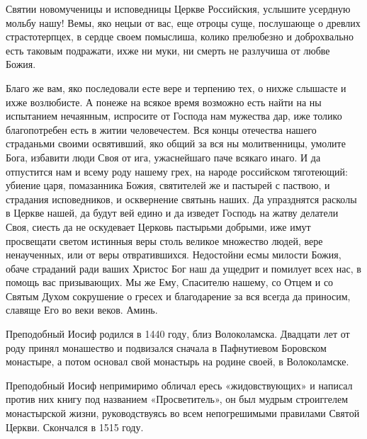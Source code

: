 \bigskip\bigskip\mychapterending

 



Святии новомученицы и исповедницы Церкве Российския, услышите усердную мольбу нашу! Вемы, яко нецыи от вас, еще отроцы суще, послушающе о древлих страстотерпцех, в сердце своем помыслиша, колико прелюбезно и доброхвально есть таковым подражати, ихже ни муки, ни смерть не разлучиша от любве Божия. 


Благо же вам, яко последовали есте вере и терпению тех, о нихже слышасте и ихже возлюбисте. А понеже на всякое время возможно есть найти на ны испытанием нечаянным, испросите от Господа нам мужества дар, иже толико благопотребен есть в житии человечестем. Вся концы отечества нашего страданьми своими освятивший, яко общий за вся ны молитвенницы, умолите Бога, избавити люди Своя от ига, ужаснейшаго паче всякаго инаго. И да отпустится нам и всему роду нашему грех, на народе российском тяготеющий: убиение царя, помазанника Божия, святителей же и пастырей с паствою, и страдания исповедников, и осквернение святынь наших. Да упразднятся расколы в Церкве нашей, да будут вей едино и да изведет Господь на жатву делатели Своя, сиесть да не оскудевает Церковь пастырьми добрыми, иже имут просвещати светом истинныя веры столь великое множество людей, вере ненаученных, или от веры отвратившихся. Недостойни есмы милости Божия, обаче страданий ради ваших Христос Бог наш да ущедрит и помилует всех нас, в помощь вас призывающих. Мы же Ему, Спасителю нашему, со Отцем и со Святым Духом сокрушение о гресех и благодарение за вся всегда да приносим, славяще Его во веки веков. Аминь.


\bigskip\bigskip\mychapterending

 

Преподобный Иосиф родился в 1440 году, близ Волоколамска. Двадцати лет от роду принял монашество и подвизался сначала в Пафнутиевом Боровском монастыре, а потом основал свой монастырь на родине своей, в Волоколамске. 

Преподобный Иосиф непримиримо обличал ересь «жидовствующих» и написал против них книгу под названием «Просветитель», он был мудрым строиггелем монастырской жизни, руководствуясь во всем непогрешимыми правилами Святой Церкви. Скончался в 1515 году.


